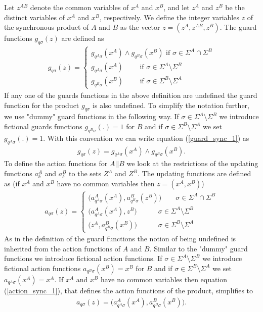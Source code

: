 \documentclass{article}
\begin{document}
 Let $z^{AB}$ denote the common variables of $x^{A}$ and $x^{B}$, and let $z^A$
and $z^B$ be the distinct variables of $x^{A}$ and $x^{B}$,
respectively. We define the integer variables $z$ of the
synchronous product of $A$ and $B$ as the vector $z=(z^A, z^{AB},
z^B)$. The guard functions $g_{q \sigma}(z)$ are defined as
\begin{eqnarray}\label{guard_sync_1}
g_{q \sigma}(z)=\left\{
\begin{array}{ll}
g_{q^A\sigma}(x^{A})\wedge g_{q^B\sigma}(x^{B}) \textrm{ if }\sigma\in \Sigma^A \cap \Sigma^B\\
g_{q^A\sigma}(x^{A}) \quad\quad \textrm{ if } \sigma\in \Sigma^A \setminus \Sigma^B\\
g_{q^B\sigma}(x^{B}) \quad\quad \textrm{ if }
\sigma\in\Sigma^B\setminus \Sigma^A
\end{array}\right.
\end{eqnarray}
If any one of the guards functions in the above definition are
undefined the guard function for the product $g_{q \sigma}$ is
also undefined. To simplify the notation further, we use "dummy"
guard functions in the following way. If $\sigma\in \Sigma^A
\setminus \Sigma^B$ we introduce fictional guards functions
$g_{q^B\sigma}(.)=1$ for $B$ and if $\sigma\in\Sigma^B\setminus
\Sigma^A$ we set $g_{q^A\sigma}(.)=1$. With this convention we can
write equation (\ref{guard_sync_1}) as
\begin{eqnarray}
g_{q \sigma}(z)= g_{q^A\sigma}(x^{A})\wedge g_{q^B\sigma}(x^{B}).
\end{eqnarray}
To define the action functions for $A||B$ we look at the
restrictions of the updating functions $a^A_\delta$ and
$a^B_\delta$ to the sets $Z^A$ and $Z^B$. The updating functions
are defined as (if $x^{A}$ and $x^{B}$ have no common variables
then $z=(x^{A},x^{B})$)
\begin{eqnarray}\label{action_sync_1}
a_{q \sigma}(z)=\left\{
\begin{array}{ll}
 \big(a^A_{q^A \sigma}(x^{A}), a^B_{q^B \sigma}(z^{B})\big)\quad\quad\sigma\in \Sigma^A \cap \Sigma^B\\
\big(a^A_{q^A \sigma}(x^{A}), z^{B}\big)\quad\quad\quad\sigma\in \Sigma^A \setminus \Sigma^B\\
\big(z^{A}, a^B_{q^B \sigma}(x^{B})\big)\quad\quad\quad\sigma\in
\Sigma^B \setminus \Sigma^A
\end{array}\right.
\end{eqnarray}
As in the definition of the guard functions the notion of being
undefined is inherited from the action functions of $A$ and $B$.
Similar to the "dummy" guard functions we introduce fictional
action functions. If $\sigma\in \Sigma^A \setminus \Sigma^B$ we
introduce fictional action functions $a_{q^B\sigma}(x^B)=x^B$ for
$B$ and if $\sigma\in\Sigma^B\setminus \Sigma^A$ we set
$a_{q^A\sigma}(x^A)=x^A$. If $x^{A}$ and $x^{B}$ have no common
variables then equation (\ref{action_sync_1}), that defines the
action functions of the product, simplifies to
\begin{eqnarray}
a_{q \sigma}(z)=
 \big(a^A_{q^A \sigma}(x^{A}), a^B_{q^B \sigma}(x^{B})\big).
\end{eqnarray}
\end{document}
